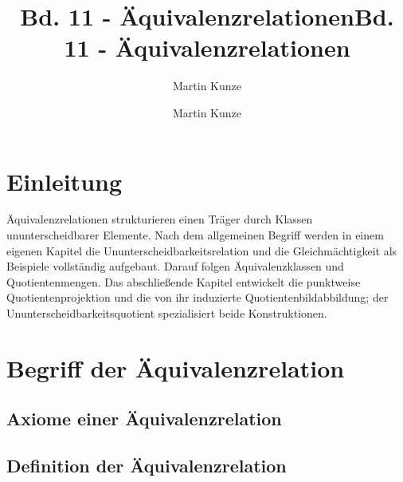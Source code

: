 \documentclass[main.tex]{subfiles}
\title{Bd. 11 - Äquivalenzrelationen}
\author{Martin Kunze}
\date{}
\begin{document}
\title{Bd. 11 - Äquivalenzrelationen}
\author{Martin Kunze}
\date{}
\hypersetup{pageanchor=false}
\maketitle
\hypersetup{pageanchor=true}
\setcounter{tocdepth}{3}
\tableofcontents
\setcounter{file}{11}
\renewcommand{\FormulaBandID}{11}

\chapter{Einleitung}

Äquivalenzrelationen strukturieren einen Träger durch Klassen
ununterscheidbarer Elemente. Nach dem allgemeinen Begriff werden in einem
eigenen Kapitel die Ununterscheidbarkeitsrelation und die Gleichmächtigkeit
als Beispiele vollständig aufgebaut. Darauf folgen Äquivalenzklassen und
Quotientenmengen. Das abschließende Kapitel entwickelt die punktweise
Quotientenprojektion und die von ihr induzierte Quotientenbildabbildung; der
Ununterscheidbarkeitsquotient spezialisiert beide Konstruktionen.

\chapter{Begriff der Äquivalenzrelation}

\section{Axiome einer Äquivalenzrelation}




\section{Definition der Äquivalenzrelation}

\end{document}
